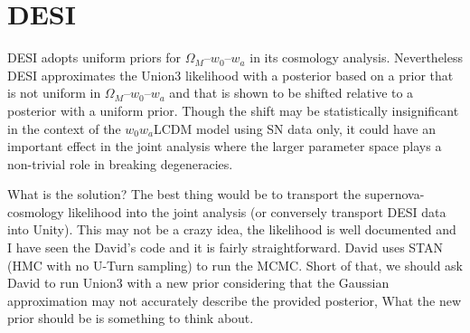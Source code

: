 \documentclass[11pt,a4paper]{article}
\begin{document}

\section{DESI}
DESI  adopts uniform priors for $\Omega_M$--$w_0$--$w_a$ in its cosmology analysis.
Nevertheless DESI approximates the Union3 likelihood with a posterior based on a prior that is not uniform in $\Omega_M$--$w_0$--$w_a$
and that is shown to be shifted relative to a posterior with a uniform prior.
Though the shift may be statistically insignificant in the context of the $w_0w_a$LCDM model using SN data only,  it could have an important effect in the joint analysis
where the larger parameter space plays a non-trivial role in breaking degeneracies.


What is the solution? The best thing would be to transport
the supernova-cosmology likelihood into the joint analysis (or conversely transport DESI data into Unity). 
This may not be a crazy idea, the likelihood is well documented
and I have seen the David's code and it is fairly straightforward.  David uses STAN  (HMC
with no U-Turn sampling) to run the MCMC.
Short of that, we should ask
David to run Union3 with a new prior considering that the Gaussian approximation may not accurately describe the provided posterior, 
What the new prior should be is something to think about.  




\end{document}
